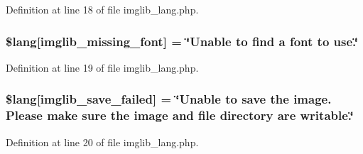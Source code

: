 Definition at line 18 of file imglib\+\_\+lang.\+php.

\subsubsection[{\texorpdfstring{\$lang}{$lang}}]{\setlength{\rightskip}{0pt plus 5cm}\$lang\mbox{[}\textquotesingle{}imglib\+\_\+missing\+\_\+font\textquotesingle{}\mbox{]} = \char`\"{}Unable to find {\bf a} font to use.\char`\"{}}\hypertarget{application_2language_2russian_2imglib__lang_8php_a935800aad2be18ca4fe99bb074674848}{}\label{application_2language_2russian_2imglib__lang_8php_a935800aad2be18ca4fe99bb074674848}


Definition at line 19 of file imglib\+\_\+lang.\+php.

\subsubsection[{\texorpdfstring{\$lang}{$lang}}]{\setlength{\rightskip}{0pt plus 5cm}\$lang\mbox{[}\textquotesingle{}imglib\+\_\+save\+\_\+failed\textquotesingle{}\mbox{]} = \char`\"{}Unable to save the image. Please make sure the image and file directory are writable.\char`\"{}}\hypertarget{application_2language_2russian_2imglib__lang_8php_a4d7a99fddc60c97a7327fa0125dea264}{}\label{application_2language_2russian_2imglib__lang_8php_a4d7a99fddc60c97a7327fa0125dea264}


Definition at line 20 of file imglib\+\_\+lang.\+php.

